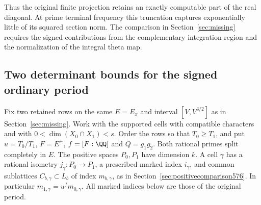 \documentclass[a4paper,11pt]{article}
\theoremstyle{definition}
\theoremstyle{remark}
\numberwithin{equation}{section}
\begin{document}
Thus the original finite projection retains an exactly
computable part of the real diagonal. At prime terminal
frequency this truncation captures exponentially little
of its squared section norm. The comparison in
Section~\ref{sec:missing} requires the signed contributions
from the complementary integration region and the
normalization of the integral theta map.


\subsection{Two determinant bounds for the signed ordinary period}
\label{sec:markedpencil602}

Fix two retained rows on the same \(E=E_x\) and interval
\([V,V^{3/2}]\) as in Section~\ref{sec:missing}. Work with the
supported cells with compatible characters and with
\(0<\dim(X_0\cap X_1)<s\). Order the rows so that
\(T_0\ge T_1\), and put \(u=T_0/T_1\), \(F=E^+\),
\(f=[F:\QQ]\) and \(Q=g_1g_2\). Both rational primes split
completely in \(E\). The positive spaces \(P_0,P_1\) have
dimension \(k\). A cell \(\gamma\) has a rational isometry
\(j_\gamma:P_0\to P_1\), a prescribed marked index \(i_\gamma\),
and common sublattices \(C_{b,\gamma}\subset L_b\) of index
\(m_{b,\gamma}\), as in Section~\ref{sec:positivecomparison576}.
In particular \(m_{1,\gamma}=u^f m_{0,\gamma}\). All marked
indices below are those of the original period.
\end{document}
